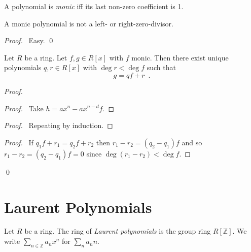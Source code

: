 \begin{df}
A polynomial is \emph{monic} iff its last non-zero coefficient is 1.
\end{df}

\begin{prop}
A monic polynomial is not a left- or right-zero-divisor.
\end{prop}

\begin{proof}
\pf\ Easy. \qed
\end{proof}

\begin{prop}
Let $R$ be a ring. Let $f,g \in R[x]$ with $f$ monic. Then there exist unique polynomials $q,r \in R[x]$ with $\deg r < \deg f$ such that
\[ g = qf + r \enspace . \]
\end{prop}

\begin{proof}
\pf
{}
\begin{proof}
\pf\ Take $h = ax^n - ax^{n-d}f$.
\end{proof}
\begin{proof}
\pf\ Repeating  by induction.
\end{proof}
\begin{proof}
\pf\ If $q_1 f + r_1 = q_2 f + r_2$ then $r_1 - r_2 = (q_2 - q_1)f$ and so $r_1 - r_2 = (q_2 - q_1) f = 0$ since $\deg (r_1 - r_2) < \deg f$.
\end{proof}
\qed
\end{proof}

\section{Laurent Polynomials}

\begin{df}
Let $R$ be a ring. The ring of \emph{Laurent polynomials} is the group ring $R[\mathbb{Z}]$. We write $\sum_{n \in \mathbb{Z}} a_n x^{n}$ for $\sum_n a_n n$.
\end{df}

